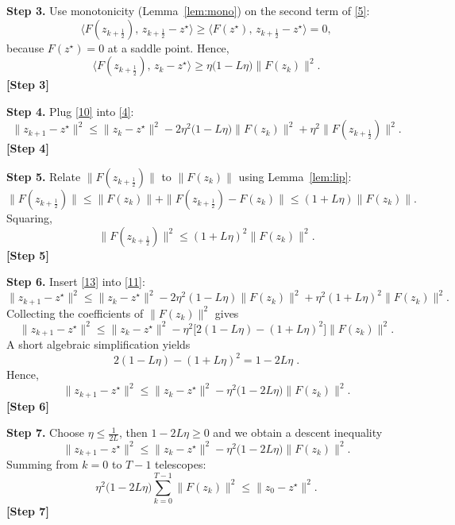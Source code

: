 \documentclass{article}
\begin{document}
\medskip
\noindent\textbf{Step 3.} Use monotonicity (Lemma~\ref{lem:mono}) on the second term of \eqref{5}:
\[
\langle F(z_{k+\frac12}),\,z_{k+\frac12}-z^\star\rangle
\ge \langle F(z^\star),\,z_{k+\frac12}-z^\star\rangle =0,
\tag{9}
\]
because $F(z^\star)=0$ at a saddle point.  
Hence,
\[
\langle F(z_{k+\frac12}),\,z_k-z^\star\rangle
\ge \eta\bigl(1-L\eta\bigr)\|F(z_k)\|^2 . \tag{10}
\]
\textbf{[Step 3]}

\medskip
\noindent\textbf{Step 4.} Plug \eqref{10} into \eqref{4}:
\[
\|z_{k+1}-z^\star\|^2
\le \|z_k-z^\star\|^2
      -2\eta^2\bigl(1-L\eta\bigr)\|F(z_k)\|^2
      +\eta^2\|F(z_{k+\frac12})\|^2 . \tag{11}
\]
\textbf{[Step 4]}

\medskip
\noindent\textbf{Step 5.} Relate $\|F(z_{k+\frac12})\|$ to $\|F(z_k)\|$ using Lemma~\ref{lem:lip}:
\[
\|F(z_{k+\frac12})\|
\le \|F(z_k)\| + \|F(z_{k+\frac12})-F(z_k)\|
\le (1+L\eta)\|F(z_k)\| . \tag{12}
\]
Squaring,
\[
\|F(z_{k+\frac12})\|^2 \le (1+L\eta)^2\|F(z_k)\|^2 . \tag{13}
\]
\textbf{[Step 5]}

\medskip
\noindent\textbf{Step 6.} Insert \eqref{13} into \eqref{11}:
\[
\|z_{k+1}-z^\star\|^2
\le \|z_k-z^\star\|^2
   -2\eta^2(1-L\eta)\|F(z_k)\|^2
   +\eta^2(1+L\eta)^2\|F(z_k)\|^2 . \tag{14}
\]
Collecting the coefficients of $\|F(z_k)\|^2$ gives
\[
\|z_{k+1}-z^\star\|^2
\le \|z_k-z^\star\|^2
   -\eta^2\bigl[2(1-L\eta)-(1+L\eta)^2\bigr]\|F(z_k)\|^2 . \tag{15}
\]
A short algebraic simplification yields
\[
2(1-L\eta)-(1+L\eta)^2 = 1-2L\eta \; .
\tag{16}
\]
Hence,
\[
\|z_{k+1}-z^\star\|^2
\le \|z_k-z^\star\|^2
   -\eta^2\bigl(1-2L\eta\bigr)\|F(z_k)\|^2 . \tag{17}
\]
\textbf{[Step 6]}

\medskip
\noindent\textbf{Step 7.} Choose $\eta\le\frac{1}{2L}$, then $1-2L\eta\ge0$ and we obtain a descent inequality
\[
\|z_{k+1}-z^\star\|^2
\le \|z_k-z^\star\|^2
   -\eta^2\bigl(1-2L\eta\bigr)\|F(z_k)\|^2 . \tag{18}
\]
Summing from $k=0$ to $T-1$ telescopes:
\[
\eta^2\bigl(1-2L\eta\bigr)\sum_{k=0}^{T-1}\|F(z_k)\|^2
\le \|z_0-z^\star\|^2 . \tag{19}
\]
\textbf{[Step 7]}
\end{document}
